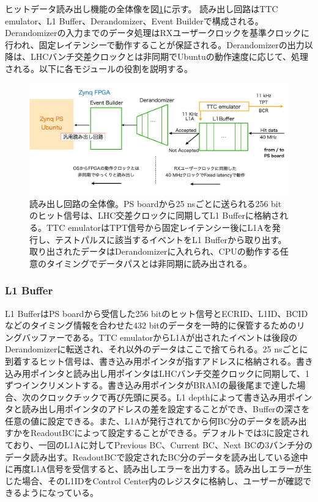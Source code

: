 ヒットデータ読み出し機能の全体像を図\ref{JATHubdaq}に示す。
読み出し回路はTTC emulator、L1 Buffer、Derandomizer、Event Builderで構成される。Derandomizerの入力までのデータ処理はRXユーザークロックを基準クロックに行われ、固定レイテンシーで動作することが保証される。Derandomizerの出力以降は、LHCバンチ交差クロックとは非同期でUbuntuの動作速度に応じて、処理される。以下に各モジュールの役割を説明する。

\begin{figure} 
\centering
\includegraphics[width=16cm]{fig/QAQC/JATHubdaq.png}
\caption[読み出し回路の全体像]{読み出し回路の全体像。PS boardから25 nsごとに送られる256 bitのヒット信号は、LHC交差クロックに同期してL1 Bufferに格納される。TTC emulatorはTPT信号から固定レイテンシー後にL1Aを発行し、テストパルスに該当するイベントをL1 Bufferから取り出す。取り出されたデータはDerandomizerに入れられ、CPUの動作する任意のタイミングでデータパスとは非同期に読み出される。}
\label{JATHubdaq}
\end{figure}

\subsubsection{L1 Buffer} 
\baselineskip
L1 BufferはPS boardから受信した256 bitのヒット信号とECRID、L1ID、BCIDなどのタイミング情報を合わせた432 bitのデータを一時的に保管するためのリングバッファーである。TTC emulatorからL1Aが出されたイベントは後段のDerandomizerに転送され、それ以外のデータはここで捨てられる。25 nsごとに到着するヒット信号は、書き込み用ポインタが指すアドレスに格納される。書き込み用ポインタと読み出し用ポインタはLHCバンチ交差クロックに同期して、1ずつインクリメントする。書き込み用ポインタがBRAMの最後尾まで達した場合、次のクロックチックで再び先頭に戻る。L1 depthによって書き込み用ポインタと読み出し用ポインタのアドレスの差を設定することができ、Bufferの深さを任意の値に設定できる。また、L1Aが発行されてから何BC分のデータを読み出すかをReadoutBCによって設定することができる。デフォルトでは3に設定されており、一回のL1Aに対してPrevious BC、Current BC、Next BCの3バンチ分のデータ読み出す。ReadoutBCで設定されたBC分のデータを読み出している途中に再度L1A信号を受信すると、読み出しエラーを出力する。読み出しエラーが生じた場合、そのL1IDをControl Center内のレジスタに格納し、ユーザーが確認できるようになっている。

